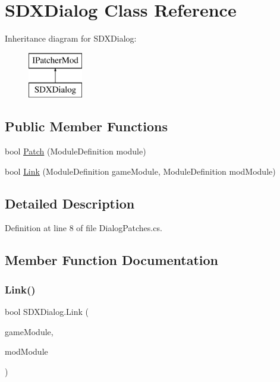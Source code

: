 \hypertarget{class_s_d_x_dialog}{}\section{S\+D\+X\+Dialog Class Reference}
\label{class_s_d_x_dialog}
Inheritance diagram for S\+D\+X\+Dialog\+:\begin{figure}[H]
\begin{center}
\leavevmode
\includegraphics[height=2.000000cm]{d1/db8/class_s_d_x_dialog}
\end{center}
\end{figure}
\subsection*{Public Member Functions}
\begin{DoxyCompactItemize}
\item 
bool \mbox{\hyperlink{class_s_d_x_dialog_a5ce84a3de0f89acb59cea0a370102eb7}{Patch}} (Module\+Definition module)
\item 
bool \mbox{\hyperlink{class_s_d_x_dialog_a3cc3613adec7a1bcb8898d461ac6eb6e}{Link}} (Module\+Definition game\+Module, Module\+Definition mod\+Module)
\end{DoxyCompactItemize}


\subsection{Detailed Description}


Definition at line 8 of file Dialog\+Patches.\+cs.



\subsection{Member Function Documentation}
\mbox{\label{class_s_d_x_dialog_a3cc3613adec7a1bcb8898d461ac6eb6e}} 
\subsubsection{\texorpdfstring{Link()}{Link()}}
{\footnotesize\ttfamily bool S\+D\+X\+Dialog.\+Link (\begin{DoxyParamCaption}\item[{Module\+Definition}]{game\+Module,  }\item[{Module\+Definition}]{mod\+Module }\end{DoxyParamCaption})}




